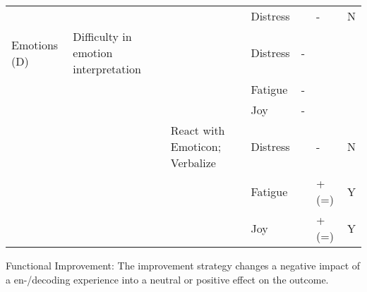 \documentclass[man]{apa7}
\begin{document}
\begin{landscape}
\begin{table}
\begin{tabular}{lllllll}
                                   &                                                 &                                  & Distress            &             & -           & N                               \\
Emotions (D)                       & Difficulty in emotion interpretation &                                  & Distress            & -           &             &                                 \\
                                   &                                                 &                                  & Fatigue             & -           &             &                                 \\
                                   &                                                 &                                  & Joy                 & -           &             &                                 \\
                                   &                                                 & React with Emoticon; Verbalize   & Distress            &             & -           & N                               \\
                                   &                                                 &                                  & Fatigue             &             & + (=)       & Y                               \\
                                   &                                                 &                                  & Joy                 &             & + (=)       & Y                              \\ \bottomrule
\end{tabular}
  \begin{tablenotes}
        {\tiny
            Functional Improvement: The improvement strategy changes a negative impact of a en-/decoding experience into a neutral or positive effect on the outcome.
         }
    \end{tablenotes}
\end{table}


\end{landscape}
\end{document}
